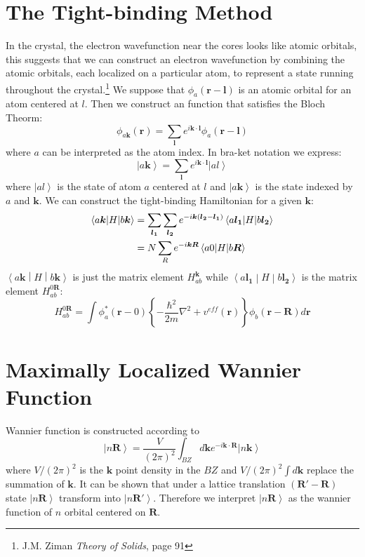 \documentclass{amsart}
\begin{document}
\section{The Tight-binding Method}
In the crystal, the electron wavefunction near the cores looks like atomic orbitals, this suggests that 
we can construct an electron wavefunction by combining the atomic orbitals, each localized on a particular atom,
to represent a state running throughout the crystal.\footnote{J.M. Ziman \emph{Theory of Solids}, page 91}
We suppose that $\phi_a(\bm{r}-\bm{l})$ is an atomic orbital for an atom centered at $l$. Then we construct an function that satisfies
the Bloch Theorm:
\begin{equation}
    \phi_{a\bm{k}}(\bm{r}) = \sum_{\bm{l}} e^{i\bm{k}\cdot\bm{l}} \phi_a(\bm{r}-\bm{l})
\end{equation}
where $a$ can be interpreted as the atom index. In bra-ket notation we express:
\begin{equation}
    \left| a\bm{k} \right\rangle = \sum_{\bm{l}} e^{i\bm{k}\cdot\bm{l}} \left| al \right\rangle
\end{equation}
where $\left| al \right\rangle$ is the state of atom $a$ centered at $l$ and $\left| a\bm{k} \right\rangle$ is the state indexed by $a$ and $\bm{k}$.
We can construct the tight-binding Hamiltonian for a given $\bm{k}$:
\begin{align} 
    \label{tb}
    \left\langle a\bm{k} \middle| H \middle| b\bm{k} \right\rangle &= \sum_{\bm{l_1}}\sum_{\bm{l_2}} e^{-i\bm{k}(\bm{l_2}-\bm{l_1})} \left\langle a\bm{l_1} \middle| H \middle| b\bm{l_2} \right\rangle \\
                        &= N\sum_R e^{-i\bm{k}\bm{R}} \left\langle a0 \middle| H \middle| b\bm{R} \right\rangle \notag
\end{align}
$\left\langle a\bm{k} \middle| H \middle| b\bm{k} \right\rangle$ is just the matrix element $H_{ab}^{\bm{k}}$ 
while $\left\langle a\bm{l_1} \middle| H \middle| b\bm{l_2} \right\rangle$ is the matrix element $H_{ab}^{0\bm{R}}$:
\begin{equation}
    H_{ab}^{0\bm{R}}=\int \phi^*_a(\bm{r}-0) \left\{ -\frac{\hbar^2}{2m}\nabla^{2} + v^{eff}(\bm{r}) \right\} \phi_b(\bm{r}-\bm{R}) d\bm{r}
\end{equation}

\section{Maximally Localized Wannier Function}
Wannier function is constructed according to 
\begin{equation}
    \left| n\bm{R} \right\rangle = \frac{V}{(2\pi)^2}\int_{BZ} d\bm{k} e^{-i\bm{k}\cdot\bm{R}} \left| n\bm{k} \right\rangle 
\end{equation}
where $V/(2\pi)^2$ is the $\bm{k}$ point density in the $BZ$ and $V/(2\pi)^2\int d\bm{k}$ replace the summation of $\bm{k}$.
It can be shown that under a lattice translation $(\bm{R'}-\bm{R})$ state  $\left| n\bm{R} \right\rangle$ transform into $\left| n\bm{R'} \right\rangle$.
Therefore we interpret  $\left| n\bm{R} \right\rangle$ as the wannier function of $n$ orbital centered on $\bm{R}$.
\end{document}

